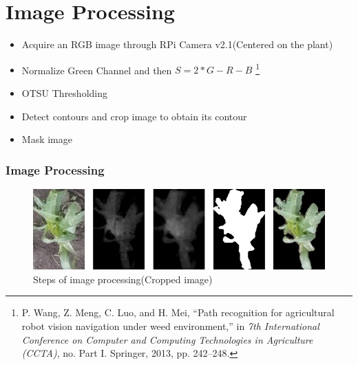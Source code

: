 \documentclass[10pt,a4paper]{beamer}
\begin{document}
\section{Image Processing}
\begin{frame}
\begin{itemize}
	\item Acquire  an RGB image through RPi Camera v2.1(Centered on the plant)
	
	\item Normalize Green Channel and then $S = 2*G - R - B$ \footnote{ P. Wang, Z. Meng, C. Luo, and H. Mei, “Path recognition for agricultural robot vision navigation under weed environment,” in \textit{7th International Conference on Computer and Computing Technologies in Agriculture (CCTA)}, no. Part I. Springer, 2013, pp. 242–248.
}
	\item OTSU Thresholding
	\item Detect contours and crop image to obtain its contour 
	\item Mask image
	
\end{itemize}
\frametitle{Image Processing}
	\begin{figure}[h]
	\centering
	\includegraphics[width=3.5 in]{SegmentationPaper}
	\caption{Steps of image processing(Cropped image)}
	\label{figure4}
	\end{figure}
\end{frame}
\end{document}

